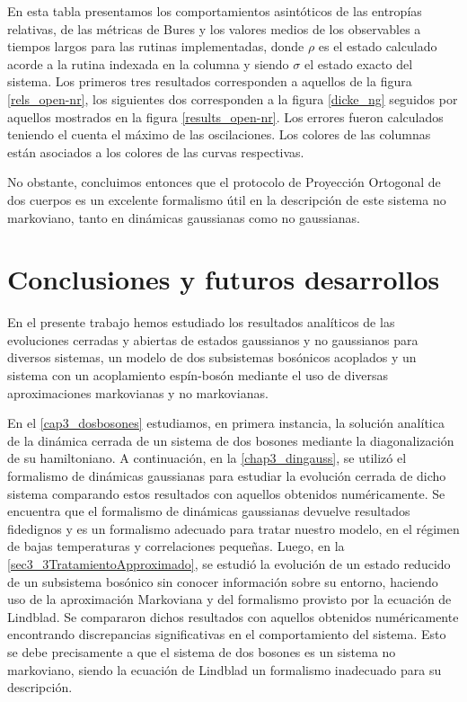 \documentclass{report} %
\numberwithin{equation}{section}
\begin{document}
\begin{table}
    \begin{tablenotes}
      \small
      \item En esta tabla presentamos los comportamientos asintóticos de las entropías relativas, de las métricas de Bures y los valores medios de los observables a tiempos largos para las rutinas implementadas, donde $\rho$ es el estado calculado acorde a la rutina indexada en la columna y siendo $\sigma$ el estado exacto del sistema. Los primeros tres resultados corresponden a aquellos de la figura \ref{rels_open-nr}, los siguientes dos corresponden a la figura \ref{dicke_ng} seguidos por aquellos mostrados en la figura \ref{results_open-nr}. Los errores fueron calculados teniendo el cuenta el máximo de las oscilaciones. Los colores de las columnas están asociados a los colores de las curvas respectivas. 
    \end{tablenotes}
    \label{table4}
\end{table}

No obstante, concluimos entonces que el protocolo de Proyección Ortogonal de dos cuerpos es un excelente formalismo útil en la descripción de este sistema no markoviano, tanto en dinámicas gaussianas como no gaussianas.

\clearpage

\chapter{Conclusiones y futuros desarrollos}
\label{Chapter6}

En el presente trabajo hemos estudiado los resultados analíticos de las evoluciones cerradas y abiertas de estados gaussianos y no gaussianos para diversos sistemas, un modelo de dos subsistemas bosónicos acoplados y un sistema con un acoplamiento espín-bosón mediante el uso de diversas aproximaciones markovianas y no markovianas.

En el  \autoref{cap3_dosbosones} estudiamos, en primera instancia, la solución analítica de la dinámica cerrada de un sistema de dos bosones mediante la diagonalización de su hamiltoniano. A continuación, en la  \autoref{chap3_dingauss}, se utilizó el formalismo de dinámicas gaussianas para estudiar la evolución cerrada de dicho sistema comparando estos resultados con aquellos obtenidos numéricamente. Se encuentra que el formalismo de dinámicas gaussianas devuelve resultados fidedignos y es un formalismo adecuado para tratar nuestro modelo, en el régimen de bajas temperaturas y correlaciones pequeñas. Luego, en la  \autoref{sec3_3TratamientoApproximado}, se estudió la evolución de un estado reducido de un subsistema bosónico sin conocer información sobre su entorno, haciendo uso de la aproximación Markoviana y del formalismo provisto por la ecuación de Lindblad. Se compararon dichos resultados con aquellos obtenidos numéricamente encontrando discrepancias significativas en el comportamiento del sistema. Esto se debe precisamente a que el sistema de dos bosones es un sistema no markoviano, siendo la ecuación de Lindblad un formalismo inadecuado para su descripción. 
\end{document}
